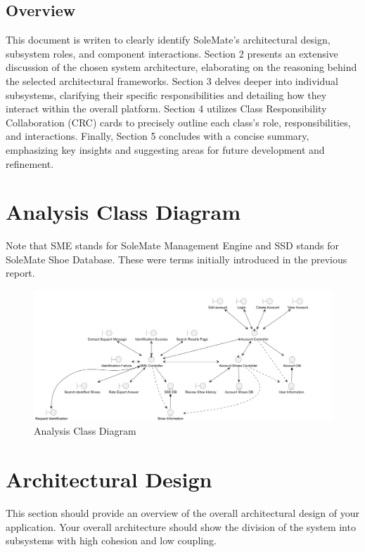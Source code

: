 \documentclass[]{article}
\begin{document}
\subsection{Overview}
\label{sub:overview}
This document is writen to clearly identify SoleMate’s architectural design, subsystem roles, and component interactions. Section 2 presents an extensive discussion of the chosen system architecture, elaborating on the reasoning behind the selected architectural frameworks. Section 3 delves deeper into individual subsystems, clarifying their specific responsibilities and detailing how they interact within the overall platform. Section 4 utilizes Class Responsibility Collaboration (CRC) cards to precisely outline each class’s role, responsibilities, and interactions. Finally, Section 5 concludes with a concise summary, emphasizing key insights and suggesting areas for future development and refinement.


\section{Analysis Class Diagram}
\label{sec:analysis_class_diagram}
Note that SME stands for SoleMate Management Engine and SSD stands for SoleMate Shoe Database. These were terms initially introduced in the previous report.
\begin{figure}[h]
	\includegraphics[width = \textwidth]{analysisClassDiagram.png}
	\caption{Analysis Class Diagram}\label{Fig:Q1}
  \end{figure}




\section{Architectural Design}
\label{sec:architectural_design}
This section should provide an overview of the overall architectural design of your application. Your overall architecture should show the division of the system into subsystems with high cohesion and low coupling.
\end{document}
